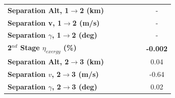 \begin{table}[ht]
\begin{tabular}{l c c c c c c}
		\textbf{Separation Alt, 1$\rightarrow$2 (km)}
		& \firstsecondSeparationAltCdThreeEightyNoReturn
		& \firstsecondSeparationAltCdThreeNinetyNoReturn
		& \firstsecondSeparationAltCdThreeStandardNoReturn
		& \firstsecondSeparationAltCdThreeOneHundredTenNoReturn
		& \firstsecondSeparationAltCdThreeOneHundredTwentyNoReturn
		& -
		\\
		\textbf{Separation v, 1$\rightarrow$2 (m/s)}
		& \firstsecondSeparationvCdThreeEightyNoReturn
		& \firstsecondSeparationvCdThreeNinetyNoReturn
		& \firstsecondSeparationvCdThreeStandardNoReturn
		& \firstsecondSeparationvCdThreeOneHundredTenNoReturn
		& \firstsecondSeparationvCdThreeOneHundredTwentyNoReturn
		& -
		\\
		\textbf{Separation $\gamma$, 1$\rightarrow$2 (deg)}
		& \firstsecondSeparationgammaCdThreeEightyNoReturn
		& \firstsecondSeparationgammaCdThreeNinetyNoReturn
		& \firstsecondSeparationgammaCdThreeStandardNoReturn
		& \firstsecondSeparationgammaCdThreeOneHundredTenNoReturn
		& \firstsecondSeparationgammaCdThreeOneHundredTwentyNoReturn
		& -
		\\
		\hline 
		\textbf{2$^{nd}$ Stage $\eta_{exergy}$ (\%)}
		& \textbf{\secondExergyEffCdThreeEightyNoReturn}
		& \textbf{\secondExergyEffCdThreeNinetyNoReturn}
		& \textbf{\secondExergyEffCdThreeStandardNoReturn}
		& \textbf{\secondExergyEffCdThreeOneHundredTenNoReturn}
		& \textbf{\secondExergyEffCdThreeOneHundredTwentyNoReturn}
		& \textbf{-0.002}
		\\

		\textbf{Separation Alt, 2$\rightarrow$3 (km)}
		& \secondthirdSeparationAltCdThreeEightyNoReturn
		& \secondthirdSeparationAltCdThreeNinetyNoReturn
		& \secondthirdSeparationAltCdThreeStandardNoReturn
		& \secondthirdSeparationAltCdThreeOneHundredTenNoReturn
		& \secondthirdSeparationAltCdThreeOneHundredTwentyNoReturn
		&0.04
		\\
		\textbf{Separation $v$, 2$\rightarrow$3 (m/s)}
		& \secondthirdSeparationvCdThreeEightyNoReturn
		& \secondthirdSeparationvCdThreeNinetyNoReturn
		& \secondthirdSeparationvCdThreeStandardNoReturn
		& \secondthirdSeparationvCdThreeOneHundredTenNoReturn
		& \secondthirdSeparationvCdThreeOneHundredTwentyNoReturn
		&-0.64
		\\
		\textbf{Separation $\gamma$, 2$\rightarrow$3 (deg)}
		& \secondthirdSeparationgammaCdThreeEightyNoReturn
		& \secondthirdSeparationgammaCdThreeNinetyNoReturn
		& \secondthirdSeparationgammaCdThreeStandardNoReturn
		& \secondthirdSeparationgammaCdThreeOneHundredTenNoReturn
		& \secondthirdSeparationgammaCdThreeOneHundredTwentyNoReturn
		&0.02
		\\
	

\end{tabular}
\end{table}
